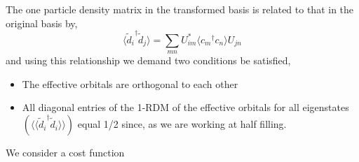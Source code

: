 \documentclass[prl,12pt,onecolumn,nofootinbib,notitlepage,english,superscriptaddress]{revtex4-1}
\begin{document}
The one particle density matrix in the transformed basis is related 
to that in the original basis by,
\begin{equation}
	\langle {\tilde{d}_i}^{\dagger} \tilde{d}_{j} \rangle = \sum_{mn} U^{*}_{im} \langle {c_m}^{\dagger} c_n \rangle U_{jn}
\end{equation}
and using this relationship we demand two conditions be satisfied,
\begin{itemize} 
 \item The effective orbitals are orthogonal to each other 
 \item All diagonal entries of the 1-RDM of the effective orbitals for all eigenstates 
       $(\langle \langle {\tilde{d}_i}^{\dagger} \tilde{d}_{i} \rangle \rangle)$ 
       equal 1/2 since, as we are working at half filling.
\end{itemize} 
We consider a cost function 
\end{document}

